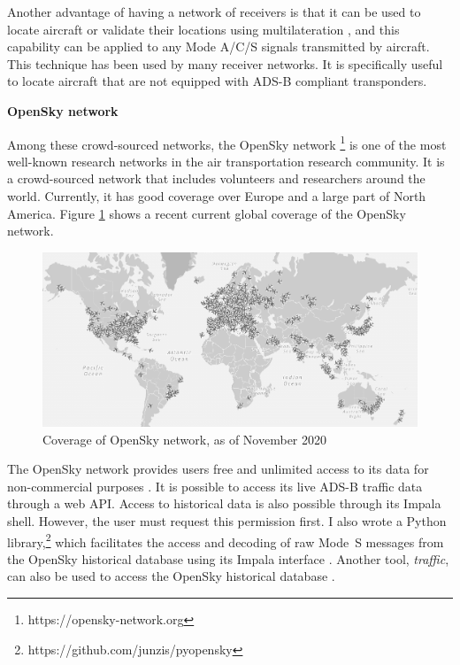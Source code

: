 Another advantage of having a network of receivers is that it can be used to locate aircraft or validate their locations using multilateration \cite{kaune2012}, and this capability can be applied to any Mode A/C/S signals transmitted by aircraft. This technique has been used by many receiver networks. It is specifically useful to locate aircraft that are not equipped with ADS-B compliant transponders.

{\large\textbf{OpenSky network}}

Among these crowd-sourced networks, the OpenSky network \footnote{https://opensky-network.org} is one of the most well-known research networks in the air transportation research community. It is a crowd-sourced network that includes volunteers and researchers around the world. Currently, it has good coverage over Europe and a large part of North America. Figure \ref{fig:opensky_coverage} shows a recent current global coverage of the OpenSky network.

\begin{figure}[ht]
    \centering
    \includegraphics[width=\columnwidth]{figures/conclusion/opensky.png}
    \caption{Coverage of OpenSky network, as of November 2020}
    \label{fig:opensky_coverage}
\end{figure}

The OpenSky network provides users free and unlimited access to its data for non-commercial purposes \cite{schafer2014opensky}. It is possible to access its live ADS-B traffic data through a web API. Access to historical data is also possible through its Impala shell. However, the user must request this permission first. I also wrote a Python library,\footnote{https://github.com/junzis/pyopensky} which facilitates the access and decoding of raw Mode~S messages from the OpenSky historical database using its Impala interface \cite{sun2019pyopensky}. Another tool, \emph{traffic}, can also be used to access the OpenSky historical database \cite{olive2019}.

